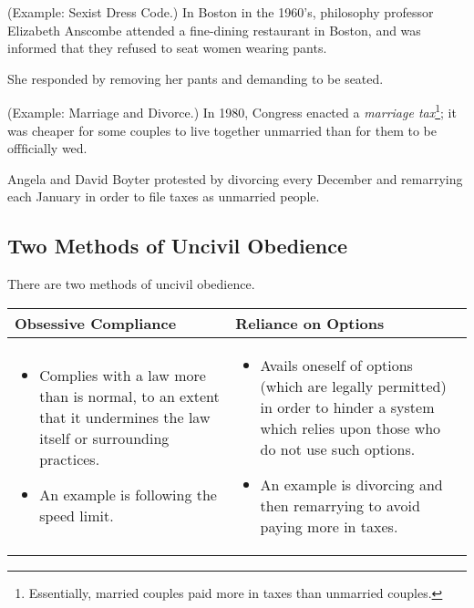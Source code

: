 \documentclass[letterpaper]{article}
\begin{document}
\begin{mdframed}[]
    (Example: Sexist Dress Code.) In Boston in the 1960's, philosophy professor Elizabeth Anscombe attended a fine-dining restaurant in Boston, and was informed that they refused to seat women wearing pants. 

    \bigskip 

    She responded by removing her pants and demanding to be seated. 
\end{mdframed}

\begin{mdframed}[]
    (Example: Marriage and Divorce.) In 1980, Congress enacted a \emph{marriage tax}\footnote{Essentially, married couples paid more in taxes than unmarried couples.}; it was cheaper for some couples to live together unmarried than for them to be offficially wed. 

    \bigskip 

    Angela and David Boyter protested by divorcing every December and remarrying each January in order to file taxes as unmarried people.
\end{mdframed}


\subsection{Two Methods of Uncivil Obedience}
There are two methods of uncivil obedience. 
\begin{center}
    \begin{tabular}{p{3in}|p{3in}}
        \textbf{Obsessive Compliance} & \textbf{Reliance on Options} \\ 
        \hline 
        \begin{itemize}
            \item Complies with a law more than is normal, to an extent that it undermines the law itself or surrounding practices.
            \item An example is following the speed limit.
        \end{itemize} & \begin{itemize}
            \item Avails oneself of options (which are legally permitted) in order to hinder a system which relies upon those who do not use such options. 
            \item An example is divorcing and then remarrying to avoid paying more in taxes.
        \end{itemize}
    \end{tabular}
\end{center}
\end{document}
